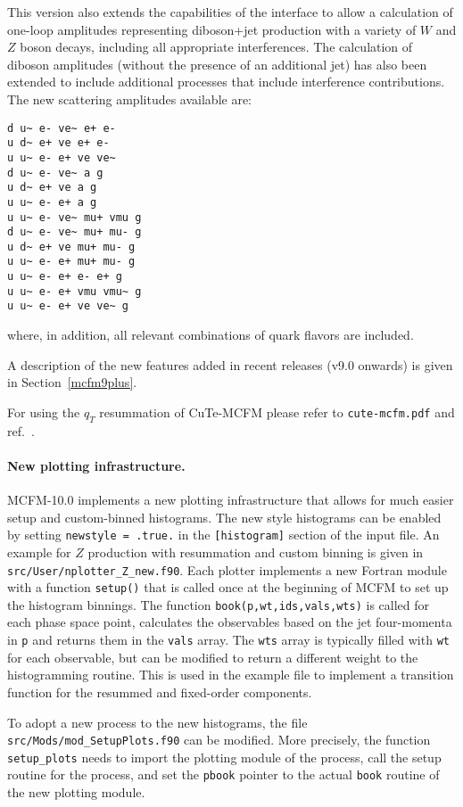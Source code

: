 This version also extends the capabilities of the interface to allow a calculation
of one-loop amplitudes representing diboson+jet production with
a variety of $W$ and $Z$ boson decays, including all appropriate interferences.
The calculation of diboson amplitudes (without the presence of an additional
jet) has also been extended to include additional processes that include
interference contributions.
The new scattering amplitudes available are:
\begin{verbatim}
d u~ e- ve~ e+ e-
u d~ e+ ve e+ e-
u u~ e- e+ ve ve~
d u~ e- ve~ a g
u d~ e+ ve a g
u u~ e- e+ a g
u u~ e- ve~ mu+ vmu g
d u~ e- ve~ mu+ mu- g
u d~ e+ ve mu+ mu- g
u u~ e- e+ mu+ mu- g
u u~ e- e+ e- e+ g
u u~ e- e+ vmu vmu~ g
u u~ e- e+ ve ve~ g
\end{verbatim}
where, in addition, all relevant combinations of quark flavors are included.

A description of the new features added in recent releases (v9.0 onwards) is 
given in Section~\ref{mcfm9plus}.


For using the $q_T$ resummation of CuTe-MCFM please refer to \texttt{cute-mcfm.pdf}
and ref.~\cite{Becher:2020ugp}.

\paragraph{New plotting infrastructure.}
MCFM-10.0 implements a new plotting infrastructure that allows for much easier setup
and custom-binned histograms. The new style histograms can be enabled by setting \texttt{newstyle = 
.true.} in the \texttt{[histogram]} section of the input file. An example for $Z$ production with 
resummation and custom binning is given in \texttt{src/User/nplotter\_Z\_new.f90}. Each plotter
implements a new Fortran module with a function \texttt{setup()} that is called once at the 
beginning of MCFM to set up the histogram binnings. The function 
\texttt{book(p,wt,ids,vals,wts)} is called for each phase space point, calculates the observables 
based on the jet four-momenta in \texttt{p} and returns them in the \texttt{vals} array. The 
\texttt{wts} array is typically filled with \texttt{wt} for each observable, but can be modified to 
return a different weight to the histogramming routine. This is used in the example file to 
implement a transition function for the resummed and fixed-order components.

To adopt a new process to the new histograms, the file \texttt{src/Mods/mod\_SetupPlots.f90}
can be modified. More precisely, the function \texttt{setup\_plots} needs to import the plotting 
module of the process, call the setup routine for the process, and set the \texttt{pbook} pointer
to the actual \texttt{book} routine of the new plotting module.

